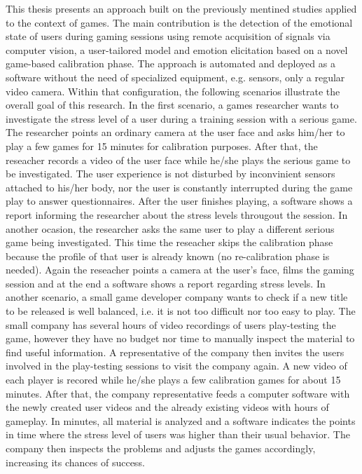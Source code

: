 This thesis presents an approach built on the previously mentined studies applied to the context of games. The main contribution is the detection of the emotional state of users during gaming sessions using remote acquisition of signals via computer vision, a user-tailored model and emotion elicitation based on a novel game-based calibration phase. The approach is automated and deployed as a software without the need of specialized equipment, e.g. sensors, only a regular video camera. Within that configuration, the following scenarios illustrate the overall goal of this research. In the first scenario, a games researcher wants to investigate the stress level of a user during a training session with a serious game. The researcher points an ordinary camera at the user face and asks him/her to play a few games for 15 minutes for calibration purposes. After that, the reseacher records a video of the user face while he/she plays the serious game to be investigated. The user experience is not disturbed by inconvinient sensors attached to his/her body, nor the user is constantly interrupted during the game play to answer questionnaires. After the user finishes playing, a software shows a report informing the researcher about the stress levels througout the session. In another ocasion, the researcher asks the same user to play a different serious game being investigated. This time the reseacher skips the calibration phase because the profile of that user is already known (no re-calibration phase is needed). Again the reseacher points a camera at the user's face, films the gaming session and at the end a software shows a report regarding stress levels. In another scenario, a small game developer company wants to check if a new title to be released is well balanced, i.e. it is not too difficult nor too easy to play. The small company has several hours of video recordings of users play-testing the game, however they have no budget nor time to manually inspect the material to find useful information. A representative of the company then invites the users involved in the play-testing sessions to visit the company again. A new video of each player is recored while he/she plays a few calibration games for about 15 minutes. After that, the company representative feeds a computer software with the newly created user videos and the already existing videos with hours of gameplay. In minutes, all material is analyzed and a software indicates the points in time where the stress level of users was higher than their usual behavior. The company then inspects the problems and adjusts the games accordingly, increasing its chances of success.

